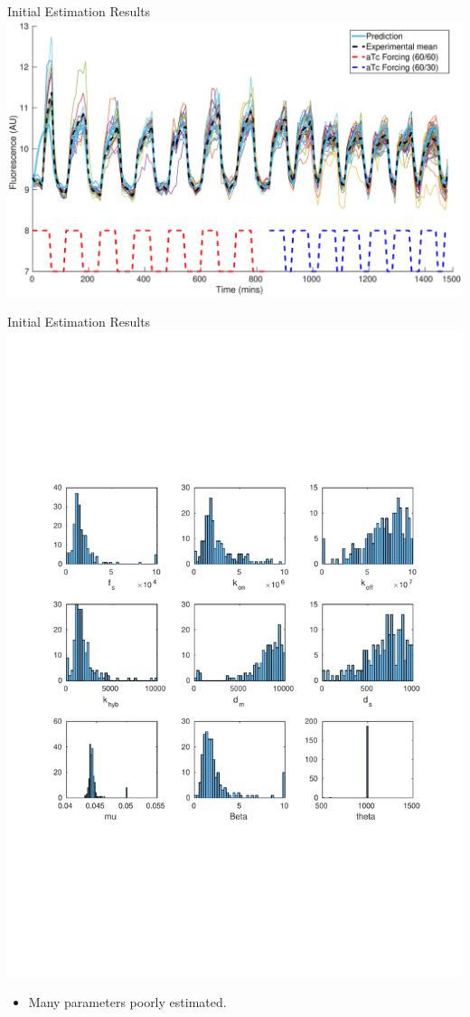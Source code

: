 \documentclass{beamer}
\begin{document}
\begin{frame}{Initial Estimation Results}
  \includegraphics[scale = 0.26, clip = true, trim = 50 0 0 0]{../Figures/13_9_bestPlot}
\end{frame}


\begin{frame}{Initial Estimation Results}
  \includegraphics[scale = 0.22, clip = true, trim = 0 0 0 0]{../Figures/13_9_hist}
        \begin{itemize}
    \item Many parameters poorly estimated.
            \end{itemize}
\end{frame}
\end{document}
